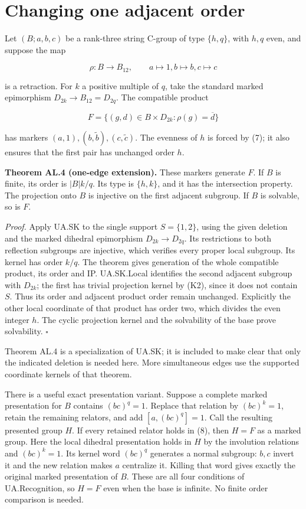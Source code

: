 \section{Changing one adjacent order}\label{changing-one-adjacent-order}

Let \((B;a,b,c)\) be a rank-three string C-group of type \(\{h,q\}\), with
\(h,q\) even, and suppose the map

\[\rho:B\longrightarrow B_{12},\qquad a\mapsto1, b\mapsto b, c\mapsto c
\tag{7}\]

is a retraction. For \(k\) a positive multiple of \(q\), take the standard
marked epimorphism \(D_{2k}\to B_{12}=D_{2q}\). The compatible product

\[F=\{(g,d)\in B\times D_{2k}:\rho(g)=\overline d\}\tag{8}\]

has markers \((a,1),(b,\widetilde b),(c,\widetilde c)\). The evenness of
\(h\) is forced by (7); it also ensures that the first pair has unchanged
order \(h\).

\textbf{Theorem AL.4 (one-edge extension).} These markers generate \(F\). If \(B\) is finite, its order
is \(|B|k/q\). Its type is \(\{h,k\}\), and it has the intersection
property. The projection onto \(B\) is injective on the first adjacent
subgroup. If \(B\) is solvable, so is \(F\).

\emph{Proof.} Apply UA.SK to the single support $S=\{1,2\}$, using the given deletion and the marked dihedral epimorphism $D_{2k}\to D_{2q}$. Its restrictions to both reflection subgroups are injective, which verifies every proper local subgroup. Its kernel has order $k/q$. The theorem gives generation of the whole compatible product, its order and IP. UA.SK.Local identifies the second adjacent subgroup with $D_{2k}$; the first has trivial projection kernel by (K2), since it does not contain $S$. Thus its order and adjacent product order remain unchanged. Explicitly the other local coordinate of that product has order two, which divides the even integer $h$. The cyclic projection kernel and the solvability of the base prove solvability. \(\square\)

Theorem AL.4 is a specialization of UA.SK; it is included to make clear that
only the indicated deletion is needed here. More simultaneous edges use
the supported coordinate kernels of that theorem.

There is a useful exact presentation variant. Suppose a complete marked
presentation for \(B\) contains \((bc)^q=1\). Replace that relation by
\((bc)^k=1\), retain the remaining relators, and add
\([a,(bc)^q]=1\). Call the resulting presented group \(H\). If every retained
relator holds in (8), then \(H=F\) as a marked group. Here the local dihedral presentation holds in $H$ by the involution relations and $(bc)^k=1$. Its kernel word $(bc)^q$ generates a normal subgroup: $b,c$ invert it and the new relation makes $a$ centralize it. Killing that word gives exactly the original marked presentation of $B$. These are all four conditions of UA.Recognition, so $H=F$ even when the base is infinite. No finite order comparison is needed.
